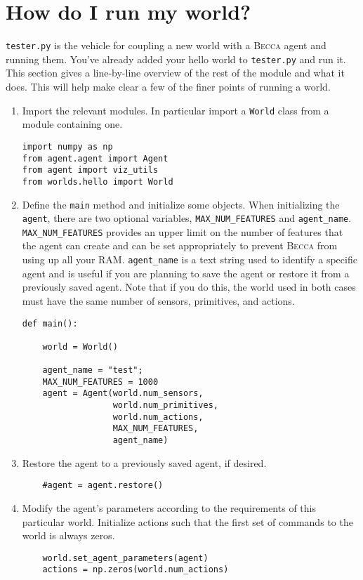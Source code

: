 \section{How do I run my world?}
\texttt{tester.py} is the vehicle for coupling a new world with a \textsc{Becca} agent and running them. You've already added your hello world to \texttt{tester.py} and run it. This section gives a line-by-line overview of the rest of the module and what it does. This will help make clear a few of the finer points of running a world.

\begin{enumerate}
\item
Import the relevant modules. In particular import a \texttt{World} class from a module containing one.
\begin{verbatim}
import numpy as np
from agent.agent import Agent
from agent import viz_utils
from worlds.hello import World
\end{verbatim}

\item
Define the \texttt{main} method and initialize some objects. When initializing the \texttt{agent}, there are two optional variables, \texttt{MAX\_NUM\_FEATURES} and \texttt{agent\_name}.  \texttt{MAX\_NUM\_FEATURES} provides an upper limit on the number of features that the agent can create and can be set appropriately to prevent \textsc{Becca} from using up all your RAM. \texttt{agent\_name} is a text string used to identify a specific agent and is useful if you are planning to save the agent or restore it from a previously saved agent. Note that if you do this, the world used in both cases must have the same number of sensors, primitives, and actions.
\begin{verbatim}
def main():
    
    world = World()
    
    agent_name = "test";
    MAX_NUM_FEATURES = 1000
    agent = Agent(world.num_sensors, 
                  world.num_primitives, 
                  world.num_actions, 
                  MAX_NUM_FEATURES, 
                  agent_name)

\end{verbatim}

\item
Restore the agent to a previously saved agent, if desired.
\begin{verbatim}
    #agent = agent.restore()
\end{verbatim}
    
\item
Modify the agent's parameters according to the requirements of this particular world. Initialize actions such that the first set of commands to the world is always zeros.
\begin{verbatim}
    world.set_agent_parameters(agent)
    actions = np.zeros(world.num_actions)
\end{verbatim}


\end{enumerate}
